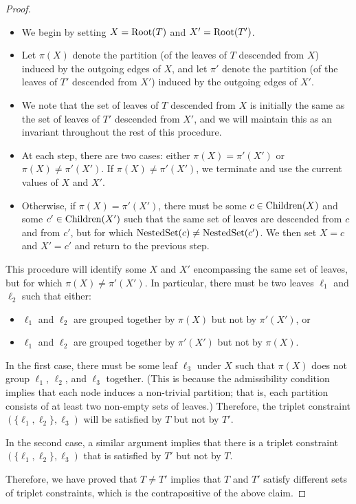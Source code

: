 \documentclass{article}
\theoremstyle{definition}
\begin{document}
\begin{proof}
\begin{itemize}
\item We begin by setting $X = \mathrm{Root}(T)$ and $X' = \mathrm{Root}(T')$.
\item Let $\pi(X)$ denote the partition (of the leaves of $T$ descended from $X$) induced by the outgoing edges of $X$, and let $\pi'$ denote the partition (of the leaves of $T'$ descended from $X'$) induced by the outgoing edges of $X'$.
\item We note that the set of leaves of $T$ descended from $X$ is initially the same as the set of leaves of $T'$ descended from $X'$, and we will maintain this as an invariant throughout the rest of this procedure.
\item At each step, there are two cases: either $\pi(X) = \pi'(X')$ or $\pi(X) \neq \pi'(X')$.  If $\pi(X) \neq \pi'(X')$, we terminate and use the current values of $X$ and $X'$.
\item Otherwise, if $\pi(X) = \pi'(X')$, there must be some $c \in \mathrm{Children}(X)$ and some $c' \in \mathrm{Children}(X')$ such that the same set of leaves are descended from $c$ and from $c'$, but for which $\mathrm{NestedSet}(c) \neq \mathrm{NestedSet}(c')$.  We then set $X = c$ and $X' = c'$ and return to the previous step.
\end{itemize}

This procedure will identify some $X$ and $X'$ encompassing the same set of leaves, but for which $\pi(X) \neq \pi'(X')$.
In particular, there must be two leaves $\ell_1$ and $\ell_2$ such that either:
\begin{itemize}
  \item $\ell_1$ and $\ell_2$ are grouped together by $\pi(X)$ but not by $\pi'(X')$, or
  \item $\ell_1$ and $\ell_2$ are grouped together by $\pi'(X')$ but not by $\pi(X)$.
\end{itemize}

In the first case, there must be some leaf $\ell_3$ under $X$ such that $\pi(X)$ does not group $\ell_1$, $\ell_2$, and $\ell_3$ together.
(This is because the admissibility condition implies that each node induces a non-trivial partition; that is, each partition consists of at least two non-empty sets of leaves.)
Therefore, the triplet constraint $(\{\ell_1, \ell_2\}, \ell_3)$ will be satisfied by $T$ but not by $T'$.

In the second case, a similar argument implies that there is a triplet constraint $(\{\ell_1, \ell_2\}, \ell_3)$ that is satisfied by $T'$ but not by $T$.

Therefore, we have proved that $T \neq T'$ implies that $T$ and $T'$ satisfy different sets of triplet constraints, which is the contrapositive of the above claim.
\end{proof}
\end{document}
